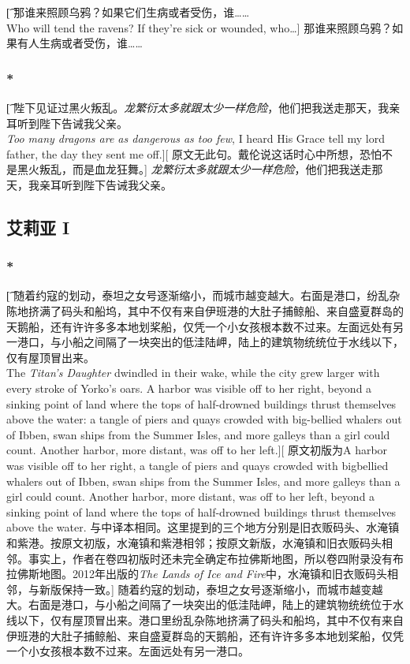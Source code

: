 \documentclass[12pt,a4paper]{article}
\begin{document}
\subsubsection{}\t[
	那谁来照顾乌鸦？如果它们生病或者受伤，谁……\\
	Who will tend the ravens? If they're sick or wounded, who\ldots]
	那谁来照顾乌鸦？如果有人生病或者受伤，谁……
	
\subsubsection{\color{red}*}\t[
	陛下见证过黑火叛乱。\emph{龙繁衍太多就跟太少一样危险}，他们把我送走那天，我亲耳听到陛下告诫我父亲。\\
	\emph{Too many dragons are as dangerous as too few}, I heard His Grace tell my lord father, the day they sent me off.][
	原文无此句。戴伦说这话时心中所想，恐怕不是黑火叛乱，而是血龙狂舞。]
	\emph{龙繁衍太多就跟太少一样危险}，他们把我送走那天，我亲耳听到陛下告诫我父亲。
	
\subsection{艾莉亚 I}
\subsubsection{\color{red}*}\t[
	随着约寇的划动，泰坦之女号逐渐缩小，而城市越变越大。右面是港口，纷乱杂陈地挤满了码头和船坞，其中不仅有来自伊班港的大肚子捕鲸船、来自盛夏群岛的天鹅船，还有许许多多本地划桨船，仅凭一个小女孩根本数不过来。左面远处有另一港口，与小船之间隔了一块突出的低洼陆岬，陆上的建筑物统统位于水线以下，仅有屋顶冒出来。\\
	The \emph{Titan's Daughter} dwindled in their wake, while the city grew larger with every stroke of Yorko's oars. A harbor was visible off to her right, beyond a sinking point of land where the tops of half-drowned buildings thrust themselves above the water: a tangle of piers and quays crowded with big-bellied whalers out of Ibben, swan ships from the Summer Isles, and more galleys than a girl could count. Another harbor, more distant, was off to her left.][
	原文初版为A harbor was visible off to her right, a tangle of piers and quays crowded with bigbellied whalers out of Ibben, swan ships from the Summer Isles, and more galleys than a girl
	could count. Another harbor, more distant, was off to her left, beyond a sinking point of land
	where the tops of half-drowned buildings thrust themselves above the water. 与中译本相同。这里提到的三个地方分别是旧衣贩码头、水淹镇和紫港。按原文初版，水淹镇和紫港相邻；按原文新版，水淹镇和旧衣贩码头相邻。事实上，作者在卷四初版时还未完全确定布拉佛斯地图，所以卷四附录没有布拉佛斯地图。2012年出版的\emph{The Lands of Ice and Fire}中，水淹镇和旧衣贩码头相邻，与新版保持一致。]
	随着约寇的划动，泰坦之女号逐渐缩小，而城市越变越大。右面是港口，与小船之间隔了一块突出的低洼陆岬，陆上的建筑物统统位于水线以下，仅有屋顶冒出来。港口里纷乱杂陈地挤满了码头和船坞，其中不仅有来自伊班港的大肚子捕鲸船、来自盛夏群岛的天鹅船，还有许许多多本地划桨船，仅凭一个小女孩根本数不过来。左面远处有另一港口。
\end{document}
